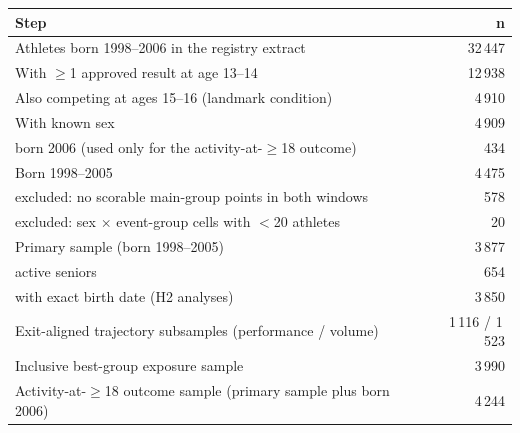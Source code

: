 \begin{tabular}{lr}
\toprule
Step & n \\
\midrule
Athletes born 1998--2006 in the registry extract & 32\,447 \\
With $\geq$1 approved result at age 13--14 & 12\,938 \\
Also competing at ages 15--16 (landmark condition) & 4\,910 \\
With known sex & 4\,909 \\
\quad born 2006 (used only for the activity-at-$\geq$18 outcome) & 434 \\
Born 1998--2005 & 4\,475 \\
\quad excluded: no scorable main-group points in both windows & 578 \\
\quad excluded: sex $\times$ event-group cells with $<$20 athletes & 20 \\
Primary sample (born 1998--2005) & 3\,877 \\
\quad active seniors & 654 \\
\quad with exact birth date (H2 analyses) & 3\,850 \\
Exit-aligned trajectory subsamples (performance / volume) & 1\,116 / 1\,523 \\
Inclusive best-group exposure sample & 3\,990 \\
Activity-at-$\geq$18 outcome sample (primary sample plus born 2006) & 4\,244 \\
\bottomrule
\end{tabular}
